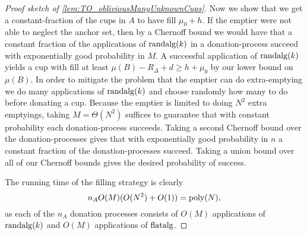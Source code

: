 \begin{proof}[Proof sketch of \cref{lem:TO_obliviousManyUnknownCups}]
Now we show that we get a constant-fraction of the cups in $A$ to
have fill $\mu_0 + h$. If the emptier were not able to neglect
the anchor set, then by a Chernoff bound we would have that a
constant fraction of the applications of $\operatorname{\text{\textup{randalg}}}(k)$ in a
donation-process succeed with exponentially good probability in
$M$. A successful application of $\operatorname{\text{\textup{randalg}}}(k)$ yields a cup with
fill at least $\mu(B) - R_\Delta + d \ge h+\mu_0$ by our lower
bound on $\mu(B)$. In order to mitigate the problem that the emptier can
do extra-emptying we do many applications of $\operatorname{\text{\textup{randalg}}}(k)$ and
choose randomly how many to do before donating a cup. Because the
emptier is limited to doing $N^2$ extra emptyings, taking
$M=\Theta(N^2)$ suffices to guarantee that with constant
probability each donation-process succeeds. Taking a second
Chernoff bound over the donation-processes gives that with
exponentially good probability in $n$ a constant fraction of the
donation-processes succeed. Taking a union bound over all of our
Chernoff bounds gives the desired probability of success. 

The running time of the filling strategy is clearly $$n_A O(M) (
O(N^2) + O(1)) = \operatorname{\text{poly}}(N),$$ as each of the $n_A$ donation
processes consists of $O(M)$ applications of $\operatorname{\text{\textup{randalg}}}(k)$ and
$O(M)$ applications of $\operatorname{\text{\textup{flatalg}}}$.

\end{proof}


